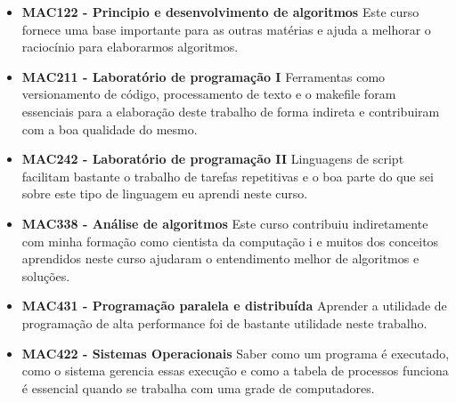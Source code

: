 \begin{itemize}
  \item \textbf{MAC122 - Principio e desenvolvimento de algoritmos } Este curso fornece uma base importante para as outras matérias e
ajuda a melhorar o raciocínio para elaborarmos algoritmos.
  \item \textbf{MAC211 - Laboratório de programação I} Ferramentas como versionamento de código, processamento de 
texto e o makefile foram essenciais para a elaboração deste trabalho de forma indireta e contribuiram com a 
boa qualidade do mesmo.
  \item \textbf{MAC242 - Laboratório de programação II} Linguagens de script facilitam bastante o trabalho de tarefas 
repetitivas e o boa parte do que sei sobre este tipo de linguagem eu aprendi neste curso.
  \item \textbf{MAC338 - Análise de algoritmos} Este curso contribuiu indiretamente com minha formação como cientista da computação i
e muitos dos conceitos aprendidos neste curso ajudaram o entendimento melhor de algoritmos e soluções.
  \item \textbf{MAC431 - Programação paralela e distribuída} Aprender a utilidade de programação de alta performance foi de bastante utilidade
neste trabalho.
  \item \textbf{MAC422 - Sistemas Operacionais} Saber como um programa é executado, como o sistema gerencia essas execução e como a tabela de processos
funciona é essencial quando se trabalha com uma grade de computadores. 
\end{itemize}


